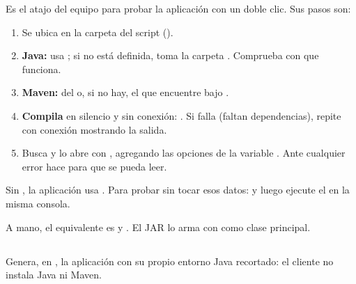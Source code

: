 Es el atajo del equipo para probar la aplicación con un doble clic. Sus pasos son:

\begin{enumerate}
	\item Se ubica en la carpeta del script ().
	\item \textbf{Java:} usa ; si no está definida, toma la carpeta
	      . Comprueba con
	       que funciona.
	\item \textbf{Maven:}  del  o, si no hay, el  que encuentre bajo
	      .
	\item \textbf{Compila} en silencio y sin conexión: . Si falla (faltan
	      dependencias), repite con conexión mostrando la salida.
	\item Busca  y lo abre con , agregando las opciones
	      de la variable . Ante cualquier error hace  para que se pueda leer.
\end{enumerate}

\begin{advertencia}
Sin , la aplicación usa . Para probar
sin tocar esos datos: 
y luego ejecute el  en la misma consola.
\end{advertencia}

A mano, el equivalente es  y . El JAR lo arma
 con  como clase principal.

\subsection{}
\label{sec:dis-crear}

Genera, en , la aplicación con su propio entorno Java recortado: el cliente no instala Java
ni Maven.

